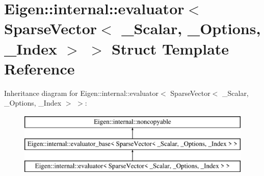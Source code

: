 \hypertarget{struct_eigen_1_1internal_1_1evaluator_3_01_sparse_vector_3_01___scalar_00_01___options_00_01___index_01_4_01_4}{}\section{Eigen\+::internal\+::evaluator$<$ Sparse\+Vector$<$ \+\_\+\+Scalar, \+\_\+\+Options, \+\_\+\+Index $>$ $>$ Struct Template Reference}
\label{struct_eigen_1_1internal_1_1evaluator_3_01_sparse_vector_3_01___scalar_00_01___options_00_01___index_01_4_01_4}
Inheritance diagram for Eigen\+::internal\+::evaluator$<$ Sparse\+Vector$<$ \+\_\+\+Scalar, \+\_\+\+Options, \+\_\+\+Index $>$ $>$\+:\begin{figure}[H]
\begin{center}
\leavevmode
\includegraphics[height=3.000000cm]{struct_eigen_1_1internal_1_1evaluator_3_01_sparse_vector_3_01___scalar_00_01___options_00_01___index_01_4_01_4}
\end{center}
\end{figure}
